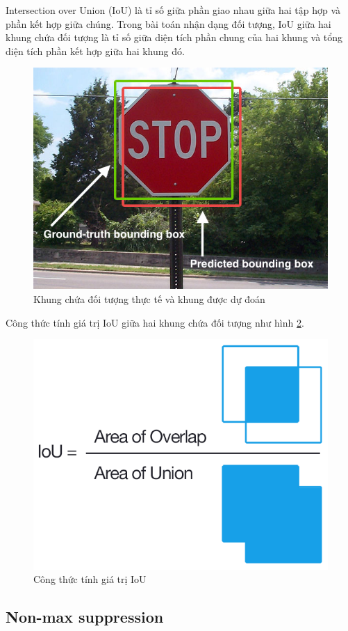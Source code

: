 \documentclass[../thesis.tex]{subfiles}
\begin{document}
Intersection over Union (IoU) là tỉ số giữa phần giao nhau giữa hai tập hợp và phần kết hợp giữa chúng. Trong bài toán nhận dạng đối tượng, IoU giữa hai khung chứa đối tượng là tỉ số giữa diện tích phần chung của hai khung và tổng diện tích phần kết hợp giữa hai khung đó.

\begin{figure}[H]
    \begin{center}
        \includegraphics[width=0.7\linewidth]{images/traffic_sign_iou.jpg}
    \end{center}
    \caption{Khung chứa đối tượng thực tế và khung được dự đoán \cite{jaccard_index}}
    \label{traffic_sign_iou}
\end{figure}

Công thức tính giá trị IoU giữa hai khung chứa đối tượng như hình \ref{iou_equation}.

\begin{figure}[H]
    \begin{center}
        \includegraphics[width=0.55\linewidth]{images/Intersection_over_Union_-_visual_equation.png}
    \end{center}
    \caption{Công thức tính giá trị IoU \cite{jaccard_index}}
    \label{iou_equation}
\end{figure}

\subsection{Non-max suppression}
\end{document}
